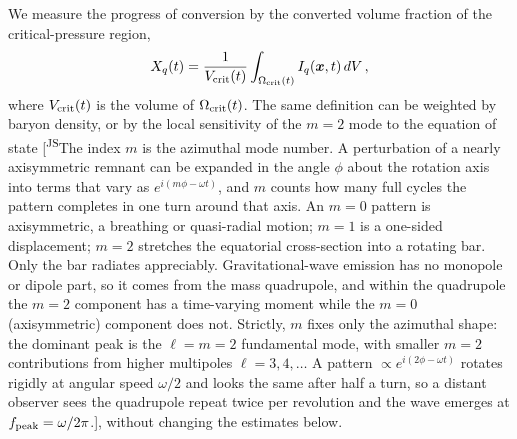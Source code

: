 \documentclass[10pt,superscriptaddress,amsmath,aps,prc,twocolumn,nofootinbib,floatfix]{revtex4-1}
\newcommand{\AHcom}[1]{\textsf{\color{cyan}{\textsuperscript{AH}#1}}}
\newcommand{\JScom}[1]{\textsf{\color{violet} [\textsuperscript{JS}#1]}}
\begin{document}
We measure the progress of conversion by the converted volume fraction of the critical-pressure region,
\begin{equation}
X_q(t)
=\frac{1}{V_{\rm crit}(t)}
\int_{\Omega_{\rm crit}(t)}I_q(\boldsymbol{x},t)\,dV\,,
\label{eq:converted_fraction}
\end{equation}
where $V_{\rm crit}(t)$ is the volume of $\Omega_{\rm crit}(t)$.
The same definition can be weighted by baryon density, or by the local sensitivity of the $m=2$ mode to the equation of state \AHcom{what does this mean?}\JScom{The index $m$ is the azimuthal mode number.
A perturbation of a nearly axisymmetric remnant can be expanded in the angle $\phi$ about the rotation axis into terms that vary as $e^{i(m\phi-\omega t)}$, and $m$ counts how many full cycles the pattern completes in one turn around that axis.
An $m=0$ pattern is axisymmetric, a breathing or quasi-radial motion; $m=1$ is a one-sided displacement; $m=2$ stretches the equatorial cross-section into a rotating bar.
Only the bar radiates appreciably.
Gravitational-wave emission has no monopole or dipole part, so it comes from the mass quadrupole, and within the quadrupole the $m=2$ component has a time-varying moment while the $m=0$ (axisymmetric) component does not.
Strictly, $m$ fixes only the azimuthal shape: the dominant peak is the $\ell=m=2$ fundamental mode, with smaller $m=2$ contributions from higher multipoles $\ell=3,4,\dots$
A pattern $\propto e^{i(2\phi-\omega t)}$ rotates rigidly at angular speed $\omega/2$ and looks the same after half a turn, so a distant observer sees the quadrupole repeat twice per revolution and the wave emerges at $f_{\rm peak}=\omega/2\pi$.}, without changing the estimates below.
\end{document}

